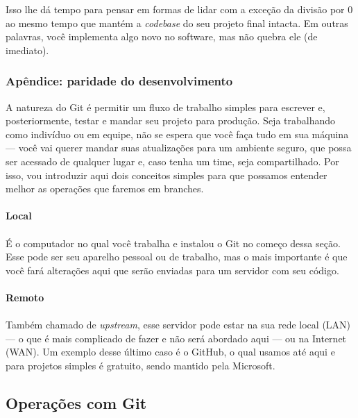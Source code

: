 \documentclass{article}
\begin{document}
	Isso lhe dá tempo para pensar em formas de lidar com a exceção da divisão por 0 ao mesmo tempo que mantém a \textit{codebase}
	do seu projeto final intacta. Em outras palavras, você implementa algo novo no software, mas não quebra ele (de imediato).


  \subsubsection{Apêndice: paridade do desenvolvimento}
  
  A natureza do Git é permitir um fluxo de trabalho simples para escrever e, posteriormente, testar e mandar seu projeto para
  produção. Seja trabalhando como indivíduo ou em equipe, não se espera que você faça tudo em sua máquina --- você vai querer
  mandar suas atualizações para um ambiente seguro, que possa ser acessado de qualquer lugar e, caso tenha um time, seja 
  compartilhado. Por isso, vou introduzir aqui dois conceitos simples para que possamos entender melhor as operações que 
  faremos em branches. 
  
  \vspace{5ex}
  \paragraph{Local}
  \paragraph{}

  É o computador no qual você trabalha e instalou o Git no começo dessa seção. Esse pode ser seu aparelho pessoal ou 
  de trabalho, mas o mais importante é que você fará alterações aqui que serão enviadas para um servidor com seu código.

  \paragraph{Remoto}
  \paragraph{}

  Também chamado de \textit{upstream}, esse servidor pode estar na sua rede local (LAN) --- o que é mais complicado de fazer e não será abordado aqui --- ou na
  Internet (WAN). Um exemplo desse último caso é o GitHub, o qual usamos até aqui e para projetos simples é gratuito, sendo 
  mantido pela Microsoft. 

  \subsection{Operações com Git}
\end{document}
